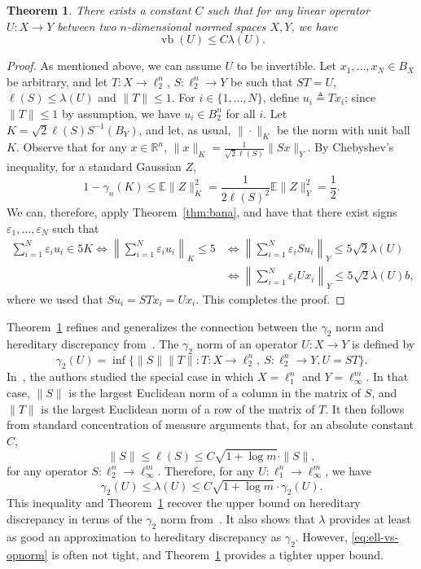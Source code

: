 \documentclass[11pt]{article}
\newtheorem{theorem}{Theorem}
\newcommand{\R}{{\mathbb{R}}}
\newcommand{\E}{\mathbb{E}}
\newcommand\eps{\varepsilon}
\newcommand{\eqdef}{\triangleq}
\DeclareMathOperator{\vb}{vb}
\begin{document}
\begin{theorem}\label{thm:factorization}
  There exists a constant $C$ such that for any linear operator $U:X
  \to Y$ between two $n$-dimensional normed spaces $X, Y$, we have
  \[
  \vb(U) \le C\lambda(U).
  \]
\end{theorem}
\begin{proof}
  As mentioned above, we can assume $U$ to be invertible.  Let $x_1,
  \ldots, x_N \in B_X$ be arbitrary, and let $T:X \to \ell_2^n$,
  $S:\ell_2^n \to Y$ be such that $ST = U$, $\ell(S)\le \lambda(U)$
  and $\|T\| \le 1$. For $i \in \{1, \ldots, N\}$, define $u_i \eqdef
  Tx_i$; since $\|T\| \le 1$ by assumption, we have $u_i \in B_2^n$
  for all $i$. Let $K = \sqrt{2}\ell(S) S^{-1}(B_Y)$, and let, as
  usual, $\|\cdot\|_K$ be the norm with unit ball $K$. Observe that
  for any $x \in \R^n$, $\|x\|_K =
  \frac{1}{\sqrt{2}\ell(S)}\|Sx\|_Y$. By Chebyshev's inequality, for a
  standard Gaussian $Z$,
  \[
  1 - \gamma_n(K)  \le \E\|Z\|_K^2 
  =   \frac{1}{2\ell(S)^2} \E\|Z\|_Y^2 = \frac12.
  \]
  We can, therefore, apply Theorem~\ref{thm:bana}, and have that there
  exist signs $\eps_1, \ldots, \eps_N$ such that 
  \begin{align*}
  \sum_{i =1}^N{\eps_i u_i} \in 5K
  \iff
  \left\|\sum_{i =1}^N{\eps_i u_i}\right\|_K \le 5
  &\iff 
  \left\|\sum_{i = 1}^N{\eps_i Su_i}\right\|_Y \le 5\sqrt{2}\lambda(U)\\
  &\iff   \left\|\sum_{i = 1}^N{\eps_i Ux_i}\right\|_Y \le 5\sqrt{2}\lambda(U)b,
  \end{align*}
  where we used that $Su_i = STx_i = Ux_i$.
  This completes the proof.
\end{proof}

Theorem~\ref{thm:factorization} refines and generalizes the connection
between the $\gamma_2$ norm and hereditary discrepancy
from~\cite{disc-gamma2}. The $\gamma_2$ norm of an operator $U:X \to
Y$ is defined by
\[
\gamma_2(U) = \inf\{\|S\| \|T\|:  T: X \to \ell_2^n,\ S: \ell_2^n
\to Y, U = ST\}.
\]
In~\cite{disc-gamma2}, the authors studied the special case in which
$X = \ell_1^n$ and $Y = \ell_\infty^m$. In that case, $\|S\|$ is the
largest Euclidean norm of a column in the matrix of $S$, and $\|T\|$
is the largest Euclidean norm of a row of the matrix of $T$. It then
follows from standard concentration of measure arguments that, for an absolute constant $C$,
\begin{equation}
  \label{eq:ell-vs-opnorm}
  \|S\| \le \ell(S) \le C\sqrt{1 + \log m} \cdot\|S\|,
\end{equation}
for any operator $S: \ell_2^n \to \ell_\infty^m$. Therefore,
for any $U:\ell_1^n \to \ell_\infty^m$, we have 
\[
\gamma_2(U) \le \lambda(U) \le C\sqrt{1 + \log m}\cdot \gamma_2(U).
\]
This inequality and Theorem~\ref{thm:factorization} recover the upper
bound on hereditary discrepancy in terms of the $\gamma_2$ norm
from~\cite{disc-gamma2}. It also shows that $\lambda$ provides at
least as good an approximation to hereditary discrepancy as $\gamma_2$.
However, \eqref{eq:ell-vs-opnorm} is often
not tight, and Theorem~\ref{thm:factorization} provides a tighter
upper bound.
\end{document}
